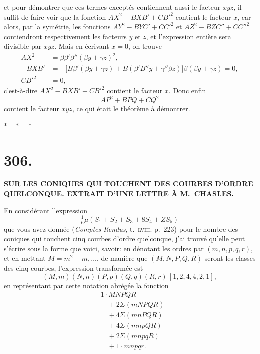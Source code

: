 \documentclass[11pt,a4paper]{article}
\begin{document}
\noindent et pour d\'{e}montrer que ces termes except\'{e}s contiennent aussi le facteur $xyz$, il suffit de faire voir que la fonction $AX^2-BXB'+CB'^2$ contient le facteur $x$, car alors, par la sym\'{e}trie, les fonctions $AY^2-BYC'+CC'^2$ et $AZ^2-BZC''+CC''^2$ contiendront respectivement les facteurs $y$ et $z$, et l'expression enti\`{e}re sera divisible par $xyz$. Mais en \'{e}crivant $x=0$, on trouve
\begin{align*}
AX^2 &= \beta\beta'\beta''(\beta y+\gamma z)^2, \\
-BXB' &= -\bigl[B\beta'(\beta y+\gamma z)+B(\beta'B''y+\gamma''\beta z)\bigr]\beta(\beta y+\gamma z)=0, \\
CB'^2 &= 0,
\end{align*}
c'est-\`{a}-dire $AX^2-BXB'+CB'^2$ contient le facteur $x$. Donc enfin
\[
AP^2+BPQ+CQ^2
\]
contient le facteur $xyz$, ce qui \'{e}tait le th\'{e}or\`{e}me \`{a} d\'{e}montrer.

\bigskip
\begin{center}$*\quad*\quad*$\end{center}
\clearpage

\section*{306.}

\begin{center}
\textbf{SUR LES CONIQUES QUI TOUCHENT DES COURBES D'ORDRE\\QUELCONQUE. EXTRAIT D'UNE LETTRE \`{A} M.~CHASLES.}
\end{center}

\bigskip


\bigskip

En consid\'{e}rant l'expression
\[
\tfrac{1}{6}\mu(S_1+S_2+S_3+8S_4+ZS_5)
\]
que vous avez donn\'{e}e (\textit{Comptes Rendus}, t.\ \textsc{lviii}. p.\ 223) pour le nombre des coniques qui touchent cinq courbes d'ordre quelconque, j'ai trouv\'{e} qu'elle peut s'\'{e}crire sous la forme que voici, savoir: en d\'{e}notant les ordres par $(m,n,p,q,r)$, et en mettant $M=m^2-m,\ldots$, de mani\`{e}re que $(M,N,P,Q,R)$ seront les classes des cinq courbes, l'expression transform\'{e}e est
\[
(M,m)(N,n)(P,p)(Q,q)(R,r)\,[1,2,4,4,2,1],
\]
en repr\'{e}sentant par cette notation abr\'{e}g\'{e}e la fonction
\begin{align*}
& 1\cdot MNPQR \\
&\quad +2\Sigma(mNPQR) \\
&\quad +4\Sigma(mnPQR) \\
&\quad +4\Sigma(mnpQR) \\
&\quad +2\Sigma(mnpqR) \\
&\quad +1\cdot mnpqr.
\end{align*}
\end{document}
